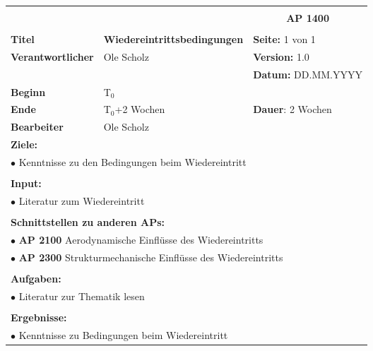 \clearpage
\begin{table}[!h]
	\begin{center}
		\begin{tabular}{|p{35mm}||p{55mm}|p{50mm}||p{40mm}|}
			\hline
			\multicolumn{3}{|l||}{\textbf{}} & \multicolumn{1}{c|}{}\\
			\multicolumn{3}{|l||}{\textbf{}} & \multicolumn{1}{c|}{\textbf{AP 1400}}\\
			\multicolumn{3}{|l||}{\textbf{}} & \multicolumn{1}{c|}{}\\
			\hline\hline
			\textbf{Titel} & \multicolumn{2}{p{7cm}||}{\textbf{Wiedereintrittsbedingungen}} 
			& \textbf{Seite:} 1 von 1\\
			\hline
			\textbf{Verantwortlicher} & \multicolumn{2}{l||}{Ole Scholz} & \textbf{Version:} 1.0\\
			\hline
			\multicolumn{3}{|l||}{} & \textbf{Datum:} DD.MM.YYYY\\
			\hline\hline
			\textbf{Beginn} & \multicolumn{2}{l||}{T$_0$} & \\
			\hline
			\textbf{Ende} & \multicolumn{2}{l||}{T$_0$+2 Wochen} & \textbf{Dauer}: 2 Wochen\\
			\hline\hline
			\textbf{Bearbeiter} & \multicolumn{3}{l|}{Ole Scholz}\\
			\hline\hline
			\multicolumn{4}{|p{150mm}|}{\textbf{Ziele:}}\\
			\multicolumn{4}{|p{150mm}|}{$\bullet$ Kenntnisse zu den Bedingungen beim Wiedereintritt}\\
			\multicolumn{4}{|p{150mm}|}{}\\
			\multicolumn{4}{|p{150mm}|}{\textbf{Input:}}\\
			\multicolumn{4}{|p{150mm}|}{$\bullet$ Literatur zum Wiedereintritt}\\
			\multicolumn{4}{|p{150mm}|}{}\\
			\multicolumn{4}{|p{150mm}|}{\textbf{Schnittstellen zu anderen APs:}}\\
			\multicolumn{4}{|p{150mm}|}{$\bullet$ \textbf{AP 2100} Aerodynamische Einflüsse des Wiedereintritts}\\
			\multicolumn{4}{|p{150mm}|}{$\bullet$ \textbf{AP 2300} Strukturmechanische Einflüsse des Wiedereintritts}\\
			\multicolumn{4}{|p{150mm}|}{}\\
			\multicolumn{4}{|p{150mm}|}{\textbf{Aufgaben:}}\\
			\multicolumn{4}{|p{150mm}|}{$\bullet$ Literatur zur Thematik lesen}\\
			\multicolumn{4}{|p{150mm}|}{}\\
			\multicolumn{4}{|p{150mm}|}{\textbf{Ergebnisse:}}\\
			\multicolumn{4}{|p{150mm}|}{$\bullet$ Kenntnisse zu Bedingungen beim Wiedereintritt}\\
			\hline
		\end{tabular}
	\end{center}
\end{table}
	
